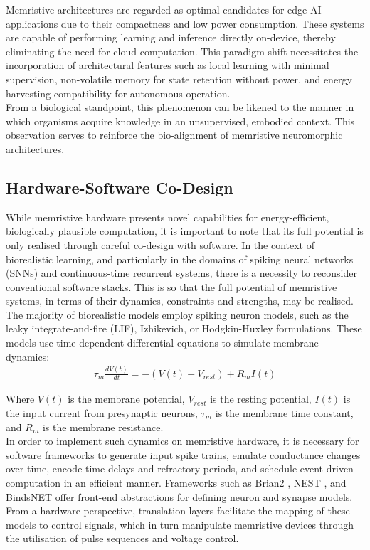 \noindent Memristive architectures are regarded as optimal candidates for edge AI applications due to their compactness and low power consumption. These systems are capable of performing learning and inference directly on-device, thereby eliminating the need for cloud computation. This paradigm shift necessitates the incorporation of architectural features such as local learning with minimal supervision, non-volatile memory for state retention without power, and energy harvesting compatibility for autonomous operation. \\

\noindent From a biological standpoint, this phenomenon can be likened to the manner in which organisms acquire knowledge in an unsupervised, embodied context. This observation serves to reinforce the bio-alignment of memristive neuromorphic architectures.

\subsection[Hardware-Software Co-Design]{Hardware-Software Co-Design}

While memristive hardware presents novel capabilities for energy-efficient, biologically plausible computation, it is important to note that its full potential is only realised through careful co-design with software. In the context of biorealistic learning, and particularly in the domains of spiking neural networks (SNNs) and continuous-time recurrent systems, there is a necessity to reconsider conventional software stacks. This is so that the full potential of memristive systems, in terms of their dynamics, constraints and strengths, may be realised.\\

\noindent The majority of biorealistic models employ spiking neuron models, such as the leaky integrate-and-fire (LIF), Izhikevich, or Hodgkin-Huxley formulations. These models use time-dependent differential equations to simulate membrane dynamics:
\begin{align}
    \tau_m \frac{dV(t)}{dt} = -(V(t) - V_{rest}) + R_mI(t) \label{eq:2.42}
\end{align}

\noindent Where $V(t)$ is the membrane potential, $V_{rest}$ is the resting potential, $I(t)$ is the input current from presynaptic neurons, $\tau_m$ is the membrane time constant, and $R_m$ is the membrane resistance.\\

\noindent In order to implement such dynamics on memristive hardware, it is necessary for software frameworks to generate input spike trains, emulate conductance changes over time, encode time delays and refractory periods, and schedule event-driven computation in an efficient manner. Frameworks such as Brian2 \cite{stimberg2019brian}, NEST \cite{gewaltig2007nest}, and BindsNET \cite{hazan2018bindsnet} offer front-end abstractions for defining neuron and synapse models. From a hardware perspective, translation layers facilitate the mapping of these models to control signals, which in turn manipulate memristive devices through the utilisation of pulse sequences and voltage control. \\

